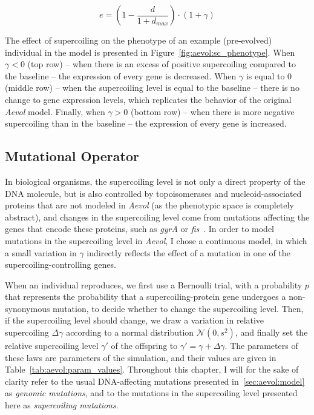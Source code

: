\begin{equation}
e = (1 - \frac{d}{1+d_{max}}) \cdot (1 + \gamma)
\label{eq:aevol:sc}
\end{equation}

The effect of supercoiling on the phenotype of an example (pre-evolved) individual in the model is presented in Figure~\ref{fig:aevol:sc_phenotype}.
When $\gamma < 0$ (top row) -- when there is an excess of positive supercoiling compared to the baseline -- the expression of every gene is decreased.
When $\gamma$ is equal to 0 (middle row) -- when the supercoiling level is equal to the baseline -- there is no change to gene expression levels, which replicates the behavior of the original \emph{Aevol} model.
Finally, when $\gamma > 0$ (bottom row) -- when there is more negative supercoiling than in the baseline -- the expression of every gene is increased.

\subsection{Mutational Operator}
\label{sec:aevol:mut-sc}

In biological organisms, the supercoiling level is not only a direct property of the DNA molecule, but is also controlled by topoisomerases and nucleoid-associated proteins that are not modeled in \emph{Aevol} (as the phenotypic space is completely abstract), and changes in the supercoiling level come from mutations affecting the genes that encode these proteins, such as \emph{gyrA} or \emph{fis}~\citep{crozat2005}.
In order to model mutations in the supercoiling level in \emph{Aevol}, I chose a continuous model, in which a small variation in $\gamma$ indirectly reflects the effect of a mutation in one of the supercoiling-controlling genes.

When an individual reproduces, we first use a Bernoulli trial, with a probability $p$ that represents the probability that a supercoiling-protein gene undergoes a non-synonymous mutation, to decide whether to change the supercoiling level.
Then, if the supercoiling level should change, we draw a variation in relative supercoiling $\Delta\gamma$ according to a normal distribution $\mathcal{N}(0, s^2)$, and finally set the relative supercoiling level $\gamma'$ of the offspring to $\gamma' = \gamma + \Delta\gamma$.
The parameters of these laws are parameters of the simulation, and their values are given in Table~\ref{tab:aevol:param_values}.
Throughout this chapter, I will for the sake of clarity refer to the usual DNA-affecting mutations presented in~\ref{sec:aevol:model} as \emph{genomic mutations}, and to the mutations in the supercoiling level presented here as \emph{supercoiling mutations}.


